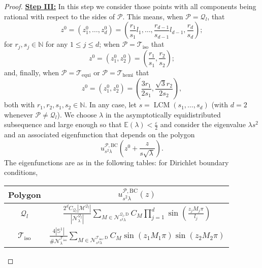 \documentclass{amsart}
\theoremstyle{definition}
\theoremstyle{remark}
\newcommand{\ep}{\varepsilon}
\renewcommand\leq\leqslant
\numberwithin{equation}{section}
\theoremstyle{definition}
\theoremstyle{remark}
\DeclareMathOperator\LCM{LCM}
\begin{document}
\begin{proof}
\textbf{	\underline{Step III:}} In this step we consider those points with all components being rational with respect to the sides of $\mathcal{P}$. This means, when $\mathcal{P}=\mathcal{Q}_l$, that
	\begin{equation}
		z^0=(z^0_1,\ldots,z_d^0)=\left(\frac{r_1}{s_1}l_1,\ldots,\frac{r_{d-1}}{s_{d-1}}l_{d-1},\frac{r_d}{s_d}\right);
	\end{equation}for $r_j,s_j\in\mathbb{N}$ for any $1\leq j\leq d$; when $\mathcal{P}=\mathcal{T}_\mathrm{iso}$ that\begin{equation}
		z^0=(z^0_1,z_2^0)=\left(\frac{r_1}{s_1},\frac{r_2}{s_2}\right);
	\end{equation} and, finally, when $\mathcal{P}=	\mathcal{T}_\mathrm{equi}$ or $\mathcal{P}=\mathcal{T}_\mathrm{hemi}$ that 
	\begin{equation}
		z^0=(z^0_1,z_2^0)=\left(\frac{3r_1}{2s_1},\frac{\sqrt{3}r_2}{2s_2}\right),
	\end{equation}
	both with $r_1,r_2,s_1,s_2\in\mathbb{N}$. In any case, let $s=\LCM(s_1,\ldots,s_d)$ (with $d=2$ whenever $\mathcal{P}\neq \mathcal{Q}_l$). We choose $\lambda$ in the asymptotically equidistributed subsequence and large enough so that $\mathbb{E}(\lambda)<\frac{\ep}{2}$ and consider the eigenvalue $\lambda s^2$ and an associated eigenfunction  that depends on the polygon\begin{equation}
		u_{s^2\lambda}^{\mathcal{P},\mathrm{BC}}\left(z^0+\frac{z}{s\sqrt{\lambda}}\right). 
	\end{equation}The eigenfunctions are as in the following tables: for Dirichlet boundary conditions,
	
		\vspace{0.1cm}
		
	\begin{tabular}{cc} 
		\hline
		\rule{0pt}{3ex}Polygon & $u_{s^2\lambda}^{\mathcal{P},\mathrm{BC}}(z)$\vspace{0.1cm} \\
		\hline
		\rule{0pt}{5ex}$\mathcal{Q}_l$& $\frac{2^dC_{\mathcal{Q}_l}|\mathcal{M}^{\mathcal{Q}_l}|}{\left|\mathcal{N}_{\lambda}^{\mathcal{Q}_l}\right|}\sum_{M\in \mathcal{N}_{s^2\lambda}^{\mathcal{Q}_l,\mathrm{D}}}C_M \prod_{j=1}^d\sin\left(\frac{z_jM_j\pi}{l_j}\right)$\\
		\rule{0pt}{5ex} $\mathcal{T}_\mathrm{iso}$ & $\frac{4|\mathbb{S}^1|}{\#\mathcal{N}_\lambda^{\mathcal{T}_\mathrm{iso}}}\sum_{M\in \mathcal{N}_{s^2\lambda}^{\mathcal{T}_\mathrm{iso},\mathrm{D}}}C_M \sin\left(z_1M_1\pi\right)\sin\left(z_2M_2\pi\right)$ \\
		

\end{tabular}
\end{proof}
\end{document}
